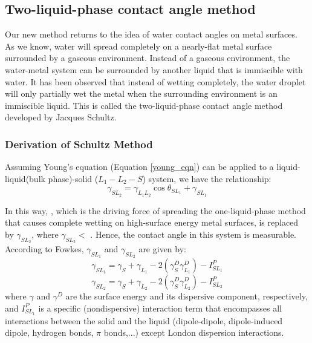 \subsection{Two-liquid-phase contact angle method}

Our new method returns to the idea of water contact angles on metal surfaces. As we know, water will spread completely on a nearly-flat metal surface surrounded by a gaseous environment. Instead of a gaseous environment, the water-metal system can be surrounded by another liquid that is immiscible with water. It has been observed that instead of wetting completely, the water droplet will only partially wet the metal when the surrounding environment is an immiscible liquid. This is called the two-liquid-phase contact angle method developed by Jacques Schultz.\cite{Schultz1977,Schultz1977a,Schultz1992} 

\subsubsection{Derivation of Schultz Method}
	
Assuming Young's equation (Equation \ref{young_eqn}) can be applied to a liquid-liquid(bulk phase)-solid ($L_{1}-L_{2}-S$) system, we have the relationship:
\begin{equation}
\label{youngs}
	\gamma_{SL_{2}} = \gamma_{L_{1}L_{2}}\cos\theta_{SL_{1}} + \gamma_{SL_{1}}
\end{equation}

In this way, \gamSV, which is the driving force of spreading the one-liquid-phase method that causes complete wetting on high-surface energy metal surfaces, is replaced by $ \gamma_{SL_{2}} $, where $\gamma_{SL_{2}} <$ \gamSV. Hence, the contact angle in this system is measurable. According to Fowkes\cite{Fowkes1964}, $\gamma_{SL_{1}}$ and $\gamma_{SL_{2}}$ are given by:
\begin{equation} 
\label{gSL1}
	\gamma_{SL_{1}} = \gamma_{S} + \gamma_{L_{1}} - 2(\gamma_{S}^{D}\gamma_{L_{1}}^{D}) - I_{SL_{1}}^{P}
\end{equation}
\begin{equation}
\label{gSL2}
	\gamma_{SL_{2}} = \gamma_{S} + \gamma_{L_{2}} - 2(\gamma_{S}^{D}\gamma_{L_{2}}^{D}) - I_{SL_{2}}^{P}
\end{equation} 
where $\gamma$ and $\gamma^{D}$ are the surface energy and its dispersive component, respectively, and $I_{SL_{1}}^{P}$ is a specific (nondispersive) interaction term that encompasses all interactions between the solid and the liquid (dipole-dipole, dipole-induced dipole, hydrogen bonds, $\pi$ bonds,...) except London dispersion interactions.


